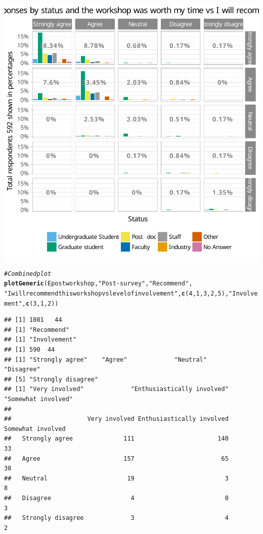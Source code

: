 \documentclass{article}\usepackage[]{graphicx}\usepackage[]{color}
\makeatletter
\newcommand{\hlnum}[1]{\textcolor[rgb]{0.686,0.059,0.569}{#1}}%
\newcommand{\hlstr}[1]{\textcolor[rgb]{0.192,0.494,0.8}{#1}}%
\newcommand{\hlcom}[1]{\textcolor[rgb]{0.678,0.584,0.686}{\textit{#1}}}%
\newcommand{\hlstd}[1]{\textcolor[rgb]{0.345,0.345,0.345}{#1}}%
\newcommand{\hlkwd}[1]{\textcolor[rgb]{0.737,0.353,0.396}{\textbf{#1}}}%
\newenvironment{kframe}{%
 \def\at@end@of@kframe{}%
 \ifinner\ifhmode%
  \def\at@end@of@kframe{\end{minipage}}%
  \begin{minipage}{\columnwidth}%
 \fi\fi%
 \def\FrameCommand##1{\hskip\@totalleftmargin \hskip-\fboxsep
 \colorbox{shadecolor}{##1}\hskip-\fboxsep
     \hskip-\linewidth \hskip-\@totalleftmargin \hskip\columnwidth}%
 \MakeFramed {\advance\hsize-\width
   \@totalleftmargin\z@ \linewidth\hsize
   \@setminipage}}%
 {\par\unskip\endMakeFramed%
 \at@end@of@kframe}
\newenvironment{knitrout}{}{} %
\makeatother
\begin{document}
\begin{knitrout}
{\centering \includegraphics[width=.6\linewidth]{figure/calls-Rnwplotting-postsurvey-data-24} 

}


\begin{kframe}\begin{alltt}
\hlcom{# Combined plot}
\hlkwd{plotGeneric}\hlstd{(Epostworkshop,} \hlstr{"Post-survey"}\hlstd{,} \hlstr{"Recommend"} \hlstd{,}
            \hlstr{"I will recommend this workshop vs level of involvement"}\hlstd{,}  \hlkwd{c}\hlstd{(}\hlnum{4}\hlstd{,}\hlnum{1}\hlstd{,}\hlnum{3}\hlstd{,}\hlnum{2}\hlstd{,}\hlnum{5}\hlstd{),}\hlstr{"Involvement"}\hlstd{,} \hlkwd{c}\hlstd{(}\hlnum{3}\hlstd{,}\hlnum{1}\hlstd{,}\hlnum{2}\hlstd{))}
\end{alltt}
\begin{verbatim}
## [1] 1081   44
## [1] "Recommend"
## [1] "Involvement"
## [1] 590  44
## [1] "Strongly agree"    "Agree"             "Neutral"           "Disagree"         
## [5] "Strongly disagree"
## [1] "Very involved"             "Enthusiastically involved" "Somewhat involved"        
##                    
##                     Very involved Enthusiastically involved Somewhat involved
##   Strongly agree              111                       140                33
##   Agree                       157                        65                38
##   Neutral                      19                         3                 8
##   Disagree                      4                         0                 3
##   Strongly disagree             3                         4                 2
\end{verbatim}
\end{kframe}


\end{knitrout}
\end{document}

